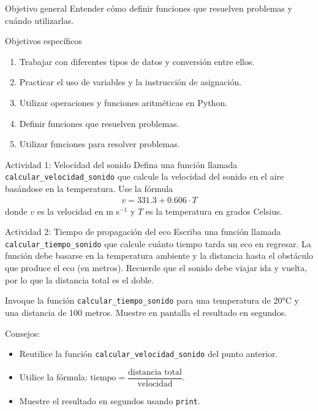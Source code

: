 \documentclass{ip-lab}
\begin{document}
\maketitle

\begin{sectionbox}{Objetivo general}
Entender cómo definir funciones que resuelven problemas y cuándo utilizarlas.
\end{sectionbox}

\begin{sectionbox}{Objetivos específicos}
\begin{enumerate}
    \item Trabajar con diferentes tipos de datos y conversión entre ellos.
    \item Practicar el uso de variables y la instrucción de asignación.
    \item Utilizar operaciones y funciones aritméticas en Python.
    \item Definir funciones que resuelven problemas.
    \item Utilizar funciones para resolver problemas.
\end{enumerate}
\end{sectionbox}

\begin{sectionbox}{Actividad 1: Velocidad del sonido}
Defina una función llamada \texttt{calcular\_velocidad\_sonido} que calcule la velocidad del sonido en el aire basándose en la temperatura. Use la fórmula
\begin{gather*}
    v = 331.3 + 0.606 \cdot T
\end{gather*}
donde $v$ es la velocidad en m s$^{-1}$ y $T$ es la temperatura en grados Celsius.
\end{sectionbox}

\begin{sectionbox}{Actividad 2: Tiempo de propagación del eco}
Escriba una función llamada \texttt{calcular\_tiempo\_sonido} que calcule cuánto tiempo tarda un eco en regresar. La función debe basarse en la temperatura ambiente y la distancia hasta el obstáculo que produce el eco (en metros). Recuerde que el sonido debe viajar ida y vuelta, por lo que la distancia total es el doble. 

Invoque la función \texttt{calcular\_tiempo\_sonido} para una temperatura de 20°C y una distancia de 100 metros. Muestre en pantalla el resultado en segundos.
\pagebreak

Consejos:
\begin{itemize}
    \item Reutilice la función \texttt{calcular\_velocidad\_sonido} del punto anterior.
    \item Utilice la fórmula: $\text{tiempo} = \dfrac{\text{distancia total}}{\text{velocidad}}$.
    \item Muestre el resultado en segundos usando \texttt{print}.
\end{itemize}
\end{sectionbox}
\end{document}
